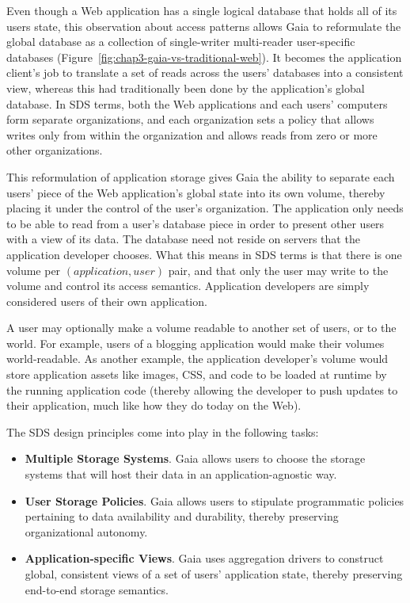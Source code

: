 Even though a Web application has a single logical database that holds all of
its users state, this observation about access patterns allows Gaia to reformulate
the global database as a collection of single-writer multi-reader user-specific
databases (Figure~\ref{fig:chap3-gaia-vs-traditional-web}).
It becomes the application client's job to translate a set of reads across
the users' databases into a consistent view, whereas this had traditionally been
done by the application's global database.  In SDS terms, both the
Web applications and each users' computers form separate organizations, and each
organization sets a policy that allows writes only from within the organization
and allows reads from zero or more other organizations.

This reformulation of application storage gives Gaia the ability to separate each
users' piece of the Web application's global state into its own volume, thereby
placing it under the control of the user's organization.
The application only needs to be able to read from a user's database piece in order to
present other users with a view of its data.  The database need not reside on
servers that the application developer chooses.  What this means in SDS terms is
that there is one volume per $(application,user)$ pair, and that only the user may
write to the volume and control its access semantics.  Application developers
are simply considered users of their own application.

A user may optionally make a volume readable to another set of users, or to the
world.  For example, users of a blogging application would make their volumes
world-readable.  As another example, the application developer's volume would
store application assets like images, CSS, and code to be loaded at runtime by
the running application code (thereby allowing the developer to push
updates to their application, much like how they do today on the Web).

The SDS design principles come into play in the following tasks:

\begin{itemize}
   \item \textbf{Multiple Storage Systems}.  Gaia allows users
      to choose the storage systems that will host their data in an
      application-agnostic way.
   \item \textbf{User Storage Policies}.  Gaia allows users to
      stipulate programmatic policies pertaining to data availability and
      durability, thereby preserving organizational autonomy.
   \item \textbf{Application-specific Views}.  Gaia uses aggregation
      drivers to construct global, consistent views of a set of users'
      application state, thereby preserving end-to-end storage semantics.
\end{itemize}

